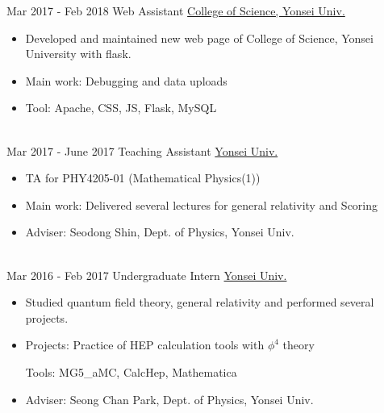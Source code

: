 \documentclass[letterpaper]{twentysecondcv} %
\begin{document}
\begin{twenty} %
    \twentyitem
    	{Mar 2017 -}
		{Feb 2018}
        {Web Assistant}
        {\href{http://science.yonsei.ac.kr/}{College of Science, Yonsei Univ.}}
        {}
        {
        {\begin{itemize}
        \item Developed and maintained new web page of College of Science, Yonsei University with flask.  
        \item Main work: Debugging and data uploads 
        \item Tool: Apache, CSS, JS, Flask, MySQL
    \end{itemize}}
        }
        \\
    \twentyitem
    	{Mar 2017 -}
		{June 2017}
        {Teaching Assistant}
        {\href{https://yonsei.ac.kr/}{Yonsei Univ.}}
        {}
        {
        {\begin{itemize}
        \item TA for PHY4205-01 (Mathematical Physics(1))  
        \item Main work: Delivered several lectures for general relativity and Scoring
        \item Adviser: Seodong Shin, Dept. of Physics, Yonsei Univ.
    \end{itemize}}
        }
        \\
    \twentyitem
    	{Mar 2016 -}
		{Feb 2017}
        {Undergraduate Intern}
        {\href{http://nexus.yonsei.ac.kr/}{Yonsei Univ.}}
        {}
        {\begin{itemize}
        \item Studied quantum field theory, general relativity and performed several projects.
        \item Projects: Practice of HEP calculation tools with $\phi^4$ theory
        
        Tools: MG5\_aMC, CalcHep, Mathematica
        
        \item Adviser: Seong Chan Park, Dept. of Physics, Yonsei Univ.
        \end{itemize}}
        
\end{twenty}

\end{document}
